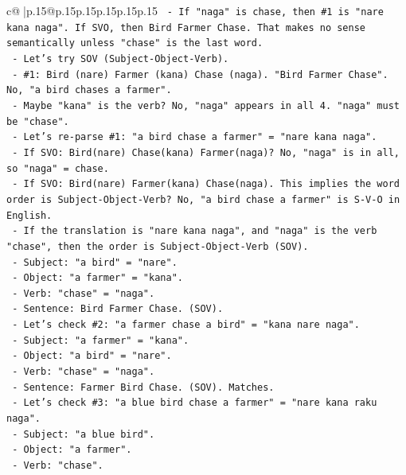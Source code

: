 \documentclass{article}
\begin{document}
{\begin{supertabular}{c@{$\;$}|p{.15\linewidth}@{}p{.15\linewidth}p{.15\linewidth}p{.15\linewidth}p{.15\linewidth}p{.15\linewidth}}
{{{\texttt{       {-} If "naga" is chase, then \#1 is "nare kana naga". If SVO, then Bird Farmer Chase. That makes no sense semantically unless "chase" is the last word.} \\
\texttt{       {-} Let's try SOV (Subject{-}Object{-}Verb).} \\
\texttt{         {-} \#1: Bird (nare) Farmer (kana) Chase (naga). "Bird Farmer Chase". No, "a bird chases a farmer".} \\
\texttt{         {-} Maybe "kana" is the verb? No, "naga" appears in all 4. "naga" must be "chase".} \\
\texttt{         {-} Let's re{-}parse \#1: "a bird chase a farmer" = "nare kana naga".} \\
\texttt{           {-} If SVO: Bird(nare) Chase(kana) Farmer(naga)? No, "naga" is in all, so "naga" = chase.} \\
\texttt{           {-} If SVO: Bird(nare) Farmer(kana) Chase(naga). This implies the word order is Subject{-}Object{-}Verb? No, "a bird chase a farmer" is S{-}V{-}O in English.} \\
\texttt{           {-} If the translation is "nare kana naga", and "naga" is the verb "chase", then the order is Subject{-}Object{-}Verb (SOV).} \\
\texttt{             {-} Subject: "a bird" = "nare".} \\
\texttt{             {-} Object: "a farmer" = "kana".} \\
\texttt{             {-} Verb: "chase" = "naga".} \\
\texttt{             {-} Sentence: Bird Farmer Chase. (SOV).} \\
\texttt{         {-} Let's check \#2: "a farmer chase a bird" = "kana nare naga".} \\
\texttt{           {-} Subject: "a farmer" = "kana".} \\
\texttt{           {-} Object: "a bird" = "nare".} \\
\texttt{           {-} Verb: "chase" = "naga".} \\
\texttt{           {-} Sentence: Farmer Bird Chase. (SOV). Matches.} \\
\texttt{         {-} Let's check \#3: "a blue bird chase a farmer" = "nare kana raku naga".} \\
\texttt{           {-} Subject: "a blue bird".} \\
\texttt{           {-} Object: "a farmer".} \\
\texttt{           {-} Verb: "chase".} \\
}}}
\end{supertabular}}
\end{document}
